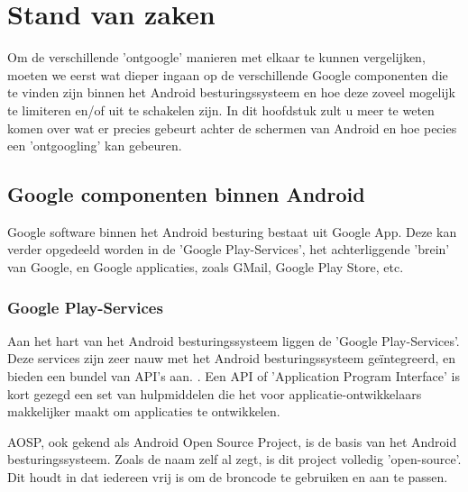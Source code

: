 \chapter{Stand van zaken}
\label{ch:stand-van-zaken}



Om de verschillende 'ontgoogle' manieren met elkaar te kunnen vergelijken, moeten we eerst wat dieper ingaan op de verschillende Google componenten die te vinden zijn binnen het Android besturingssysteem en hoe deze zoveel mogelijk te limiteren en/of uit te schakelen zijn. In dit hoofdstuk zult u meer te weten komen over wat er precies gebeurt achter de schermen van Android en hoe pecies een 'ontgoogling' kan gebeuren.

\section{Google componenten binnen Android}
Google software binnen het Android besturing bestaat uit Google App. Deze kan verder opgedeeld worden in de 'Google Play-Services', het achterliggende 'brein' van Google, en Google applicaties, zoals GMail, Google Play Store, etc.

\subsection{Google Play-Services}

Aan het hart van het Android besturingssysteem liggen de 'Google Play-Services'. Deze services zijn zeer nauw met het Android besturingssysteem geïntegreerd, en bieden een bundel van API's aan. \autocite{marshall_google-play-services}. Een API of 'Application Program Interface' is kort gezegd een set van hulpmiddelen die het voor applicatie-ontwikkelaars makkelijker maakt om applicaties te ontwikkelen. \autocite{beal_api}

AOSP, ook gekend als Android Open Source Project, is de basis van het Android besturingssysteem. Zoals de naam zelf al zegt, is dit project volledig 'open-source'. Dit houdt in dat iedereen vrij is om de broncode te gebruiken en aan te passen. 

